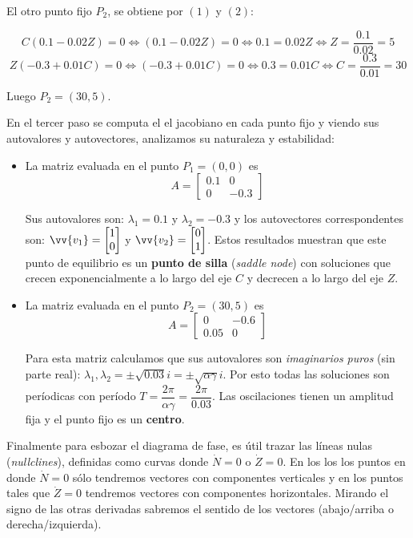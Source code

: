 \documentclass[12pt,letterpaper]{article}
\begin{document}
El otro punto fijo $P_2$, se obtiene por $(1)$ y $(2)$: 

$$C(0.1 - 0.02 Z) = 0 \iff (0.1 - 0.02 Z) = 0 \iff 0.1 = 0.02 Z \iff Z = \dfrac{0.1}{0.02} = 5$$ 
$$Z(-0.3 + 0.01 C) = 0 \iff (-0.3 + 0.01 C) = 0 \iff 0.3 = 0.01 C \iff C = \dfrac{0.3}{0.01} = 30 $$ 

Luego $P_2 = (30, 5)$. 

En el tercer paso se computa el el jacobiano en cada punto fijo y viendo sus autovalores y autovectores, analizamos su naturaleza y estabilidad:

\begin{itemize} 
\item La matriz evaluada en el punto $P_1 = (0, 0)$ es 
$$A = \begin{bmatrix}
0.1 & 0 \\
0 & -0.3   
\end{bmatrix}$$

Sus autovalores son: $\lambda_1 = 0.1$ y $\lambda_2 = -0.3$ y los autovectores correspondentes son: $\vv{v_1} = \begin{bmatrix}1 \\ 0\end{bmatrix}$ y $\vv{v_2} = \begin{bmatrix}0 \\ 1\end{bmatrix}$. Estos resultados muestran que este punto de equilibrio es un \textbf{punto de silla} (\textit{saddle node}) con soluciones que crecen exponencialmente a lo largo del eje $C$ y decrecen a lo largo del eje $Z$.
\end{itemize}

\begin{itemize}
\item La matriz evaluada en el punto $P_2 = (30, 5)$ es 
$$A = \begin{bmatrix}
0 & -0.6 \\
0.05 & 0   
\end{bmatrix}$$

Para esta matriz calculamos que sus autovalores son \textit{imaginarios puros} (sin parte real): $\lambda_1, \lambda_2 = \pm \sqrt{0.03} i = \pm \sqrt{\alpha \gamma} i $. Por esto todas las soluciones son períodicas con período $T = \dfrac{2\pi}{\alpha \gamma} = \dfrac{2\pi}{0.03}$. Las oscilaciones tienen un amplitud fija y el punto fijo es un \textbf{centro}.

\end{itemize}

Finalmente para esbozar el diagrama de fase, es útil trazar las líneas nulas (\textit{nullclines}), definidas como
curvas donde $\dot{N} = 0$ o $\dot{Z} = 0$. En los los los puntos en donde $\dot{N} = 0$ sólo tendremos vectores con componentes verticales y en los puntos tales que $\dot{Z} = 0$ tendremos vectores con componentes horizontales. Mirando el signo de las otras derivadas sabremos el sentido de los vectores (abajo/arriba o derecha/izquierda).   
\end{document}
